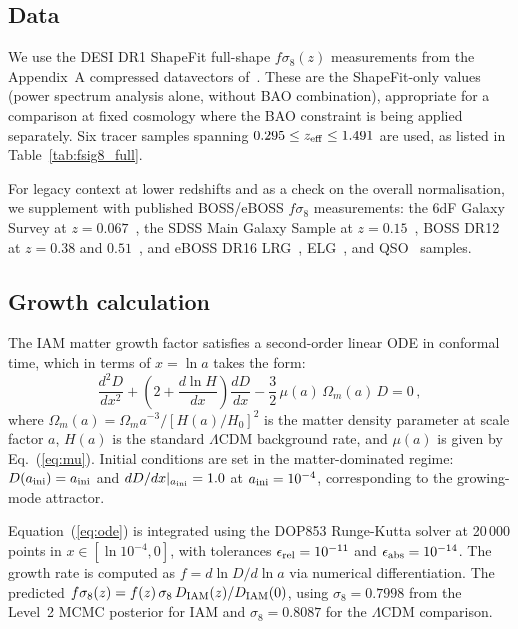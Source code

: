 \documentclass[12pt,a4paper]{article}
\newcommand{\lcdm}{$\Lambda$CDM}
\begin{document}
\subsection{Data}
\label{sec:data_fsig8}

We use the DESI DR1 ShapeFit full-shape $f\sigma_8(z)$ measurements from
the Appendix~A compressed datavectors of~\citet{DESI2024DR1FS}.
These are the ShapeFit-only values (power spectrum analysis alone, without
BAO combination), appropriate for a comparison at fixed cosmology where
the BAO constraint is being applied separately.
Six tracer samples spanning $0.295 \leq z_{\rm eff} \leq 1.491$ are used,
as listed in Table~\ref{tab:fsig8_full}.

For legacy context at lower redshifts and as a check on the overall
normalisation, we supplement with published BOSS/eBOSS $f\sigma_8$
measurements: the 6dF Galaxy Survey at $z = 0.067$~\citep{Beutler2012},
the SDSS Main Galaxy Sample at $z = 0.15$~\citep{Howlett2015},
BOSS DR12 at $z = 0.38$ and $0.51$~\citep{Alam2017boss}, and eBOSS DR16
LRG~\citep{deMattia2021}, ELG~\citep{deMattia2021}, and
QSO~\citep{Hou2021} samples.

\subsection{Growth calculation}
\label{sec:growth_calc}

The IAM matter growth factor satisfies a second-order linear ODE
in conformal time, which in terms of $x = \ln a$ takes the form:
\begin{equation}
\frac{d^2 D}{dx^2}
+ \left(2 + \frac{d\ln H}{dx}\right)\frac{dD}{dx}
- \frac{3}{2}\,\mu(a)\,\Omega_m(a)\,D = 0 \,,
\label{eq:ode}
\end{equation}
where $\Omega_m(a) = \Omega_m a^{-3}/[H(a)/H_0]^2$ is the matter density
parameter at scale factor $a$, $H(a)$ is the standard \lcdm{} background
rate, and $\mu(a)$ is given by Eq.~(\ref{eq:mu}).
Initial conditions are set in the matter-dominated regime:
$D(a_{\rm ini}) = a_{\rm ini}$ and $dD/dx|_{a_{\rm ini}} = 1.0$
at $a_{\rm ini} = 10^{-4}$, corresponding to the growing-mode attractor.

Equation~(\ref{eq:ode}) is integrated using the DOP853 Runge-Kutta
solver at 20\,000 points in $x \in [\ln 10^{-4}, 0]$, with tolerances
$\epsilon_{\rm rel} = 10^{-11}$ and $\epsilon_{\rm abs} = 10^{-14}$.
The growth rate is computed as $f = d\ln D/d\ln a$ via numerical
differentiation.
The predicted $f\sigma_8(z) = f(z)\,\sigma_8\,D_{\rm IAM}(z)/D_{\rm IAM}(0)$,
using $\sigma_8 = 0.7998$ from the Level~2 MCMC posterior for IAM
and $\sigma_8 = 0.8087$ for the \lcdm{} comparison.
\end{document}
